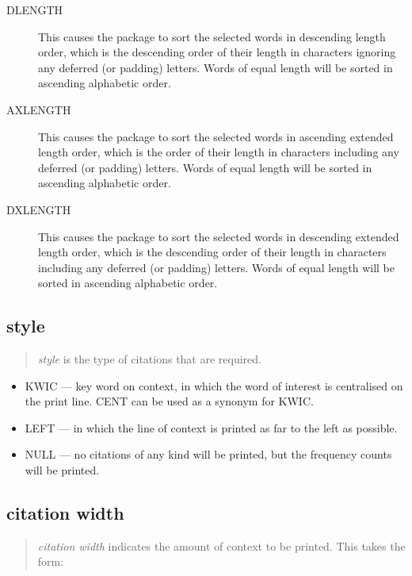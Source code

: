 \begin{description}
\item[DLENGTH]
This causes the package to sort the selected words in descending
length order, which is the descending order of their length in
characters ignoring any deferred (or padding) letters. Words of equal
length will be sorted in ascending alphabetic order.

\item[AXLENGTH]
This causes the package to sort the selected words in ascending
extended length order, which is the order of their length in
characters including any deferred (or padding) letters. Words of equal
length will be sorted in ascending alphabetic order.

\item[DXLENGTH]
This causes the package to sort the selected words in descending
extended length order, which is the descending order of their length in
characters including any deferred (or padding) letters. Words of equal
length will be sorted in ascending alphabetic order.
\end{description}

\subsection{style}
\label{style}
\begin{quote}
{\em style} is the type of citations that are required.
\end{quote}

\begin{itemize}
\item   KWIC --- key word on context, in which the word of interest is
      centralised on the print line.  CENT can be used as a synonym
for KWIC.
\item   LEFT --- in which the line of context is printed as far to the left
      as possible.
\item   NULL --- no citations of any kind will be printed, but the frequency
      counts will be printed.
\end{itemize}

\subsection{citation width}
\label{width}
\begin{quote}
{\em citation width} indicates the amount of context to be printed.  This
takes the form:
\end{quote}

